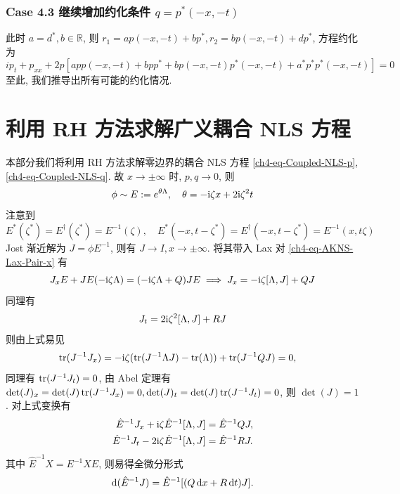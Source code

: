 \subsubsection*{Case 4.3 继续增加约化条件 $ q = p^{*}(-x,-t) $}
此时 $ a = d^{*}, b \in \mathbb{R} $, 则 $ r_1 = ap(-x,-t) + bp^{*}, r_2 = bp(-x,-t) + dp^{*} $, 方程约化为
\begin{equation}
    ip_t + p_{xx} + 2p \left[ app(-x,-t) + bpp^{*} + bp(-x,-t)p^{*}(-x,-t) + a^{*}p^{*}p^{*}(-x,-t) \right] = 0
\end{equation}
至此, 我们推导出所有可能的约化情况.

\section{利用 RH 方法求解广义耦合 NLS 方程}
本部分我们将利用 RH 方法求解零边界的耦合 NLS 方程 \eqref{ch4-eq-Coupled-NLS-p}, \eqref{ch4-eq-Coupled-NLS-q}. 故 $ x \to \pm \infty $ 时, $ p, q \to 0 $, 则
\begin{equation}
    \phi \sim E := e^{\theta \Lambda}, \quad \theta = -\mathrm{i} \zeta x + 2 \mathrm{i} \zeta^{2} t
\end{equation}
注意到
\begin{equation}
    E^{*}(\zeta^{*}) = E^{\dagger}(\zeta^{*}) = E^{-1}(\zeta), \quad E^{*}(-x, t-\zeta^{*}) = E^{\dagger}(-x, t-\zeta^{*}) = E^{-1}(x,t\zeta)
\end{equation}
Jost 渐近解为 $ J = \phi E^{-1} $, 则有 $J \to I, x \to \pm \infty$. 将其带入 Lax 对 \eqref{ch4-eq-AKNS-Lax-Pair-x} 有
\begin{equation}
    J_{x}E + J E(- \mathrm{i} \zeta \Lambda) = (-\mathrm{i} \zeta \Lambda + Q) J E \implies J_{x} = - \mathrm{i} \zeta [\Lambda, J] + Q J
    \label{ch4-eq-Lax-mod-x}
\end{equation}
同理有
\begin{equation}
    J_{t} = 2 \mathrm{i} \zeta^{2} [\Lambda, J] + R J
    \label{ch4-eq-Lax-mod-t}
\end{equation}
则由上式易见
\begin{equation}
    \operatorname*{tr}(J^{-1} J_{x}) = - \mathrm{i} \zeta (\operatorname*{tr}(J^{-1} \Lambda J) - \operatorname*{tr}(\Lambda)) + \operatorname*{tr}(J^{-1}Q J) = 0, \quad
\end{equation}
同理有 $\operatorname*{tr}(J^{-1} J_{t}) = 0$, 由 Abel 定理有 $\det(J)_{x} = \det(J) \operatorname*{tr}(J^{-1} J_{x}) = 0, \det(J)_{t} = \det(J) \operatorname*{tr}(J^{-1} J_{t}) = 0$, 则 $\det(J) = 1$. 对上式变换有
\begin{equation}
    \begin{aligned}
        \hat{E}^{-1} J_{x} + \mathrm{i} \zeta \hat{E}^{-1} [\Lambda, J]   & = \hat{E}^{-1} Q J, \\
        \hat{E}^{-1} J_{t} - 2 \mathrm{i} \zeta \hat{E}^{-1} [\Lambda, J] & = \hat{E}^{-1} R J.
    \end{aligned}
\end{equation}
其中 $\hat{E}^{-1} X = E^{-1} X E$, 则易得全微分形式
\begin{equation}
    \mathop{}\!\mathrm{d}(\hat{E}^{-1} J) = \hat{E}^{-1} [(Q \mathop{}\!\mathrm{d} x + R \mathop{}\!\mathrm{d} t) J]. \label{ch4-eq-reverse-x-volterra}
\end{equation}
